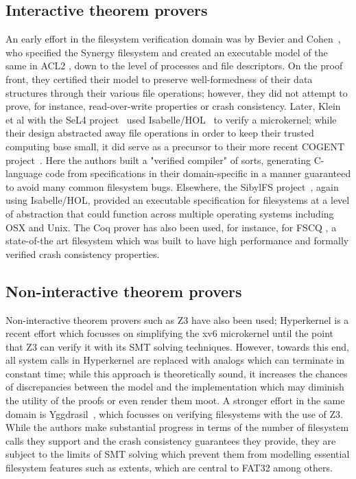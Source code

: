 \documentclass[runningheads,a4paper]{llncs}
\begin{document}
\subsection{Interactive theorem provers}
An early effort in the filesystem verification domain was by Bevier
and Cohen~\cite{bevier1996executable}, who specified the Synergy
filesystem and created an executable model of the same in ACL2
\cite{kaufmann_manolios_moore_2000}, down to the level of processes
and file descriptors. On the proof front, they certified their model
to preserve well-formedness of their data structures through their
various file operations; however, they did not attempt to prove, for
instance, read-over-write properties or crash consistency. Later,
Klein et al with the SeL4 project~\cite{klein2009sel4} used
Isabelle/HOL~\cite{nipkow2002isabelle} to verify a microkernel;
while their design abstracted away file operations in order to keep
their trusted computing base small, it did serve as a precursor to their
more recent COGENT project~\cite{amani2016cogent}. Here the authors
built a "verified compiler" of sorts, generating C-language code from
specifications in their domain-specific in a manner guaranteed to
avoid many common filesystem bugs. Elsewhere, the SibylFS
project~\cite{ridge2015sibylfs}, again using Isabelle/HOL, provided
an executable specification for filesystems at a level of abstraction
that could function across multiple operating systems including OSX
and Unix. The Coq prover \cite{bertot2013interactive} has also been
used, for instance, for FSCQ
\cite{DBLP:conf/usenix/ChenZCCKZ16}, a state-of-the art filesystem
which was built to have high performance and formally verified crash
consistency properties.

\subsection{Non-interactive theorem provers}
Non-interactive theorem provers such as Z3 \cite{de2008z3}
have also been used; Hyperkernel
\cite{Nelson:2017:HPV:3132747.3132748} is a recent effort which
focusses on simplifying the xv6 microkernel until the point that Z3
can verify it with its SMT solving techniques. However, towards this
end, all system calls in Hyperkernel are replaced with analogs which
can terminate in constant time; while this approach is theoretically
sound, it increases the chances of discrepancies between the model and
the implementation which may diminish the utility of the proofs or
even render them moot. A stronger effort in the same domain is
Yggdrasil~\cite{sigurbjarnarson2016push}, which focusses on verifying
filesystems with the use of Z3. While the authors make substantial
progress in terms of the number of filesystem calls they support and
the crash consistency guarantees they provide, they are subject to
the limits of SMT solving which prevent them from modelling essential
filesystem features such as extents, which are central to FAT32 among
others.
\end{document}

